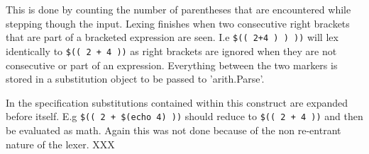 This is done by counting the number of parentheses that are encountered while stepping though the input.
Lexing finishes when two consecutive right brackets that are part of a bracketed expression are seen.
I.e \verb!$(( 2+4 ) ) ))! will lex identically to \verb!$(( 2 + 4 ))! as right brackets are ignored when they are not consecutive or part of an expression.
Everything between the two markers is stored in a substitution object to be passed to 'arith.Parse'.

In the specification substitutions contained within this construct are expanded before itself.
E.g \verb!$(( 2 + $(echo 4) ))! should reduce to \verb!$(( 2 + 4 ))! and then be evaluated as math.
Again this was not done because of the non re-entrant nature of the lexer. XXX












